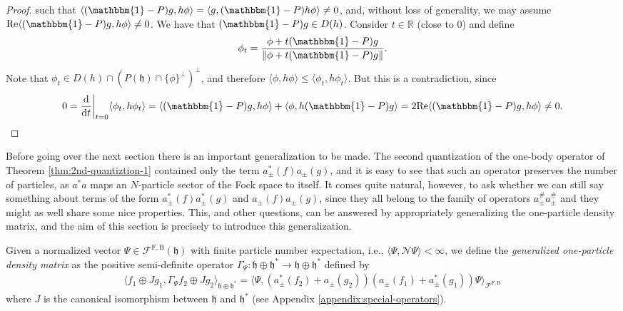 \begin{proof}
	such that $\langle(\mathbbm{1}-P)g,h\phi\rangle=\langle g,(\mathbbm{1}-P)h\phi\rangle\neq0$,
	and, without loss of generality, we may assume $\mathrm{Re}\langle(\mathbbm{1}-P)g,h\phi
	\rangle\neq0$. We have that $(\mathbbm{1}-P)g\in D(h)$. Consider $t\in\mathbb{R}$ (close to
	0) and define
	\begin{align*}
		\phi_t = \frac{\phi+t(\mathbbm{1}-P)g}{\Vert\phi+t(\mathbbm{1}-P)g\Vert}.
	\end{align*}
	Note that $\phi_t\in D(h)\cap(P(\mathfrak{h})\cap\{\phi\}^\perp)^\perp$, and therefore
	$\langle\phi,h\phi\rangle\leq\langle\phi_t,h\phi_t\rangle$. But this is a contradiction,
	since
	\begin{align*}
		0 = \frac{\dx}{\dx t}\bigg|_{t=0}\langle\phi_t,h\phi_t\rangle
		= \langle(\mathbbm{1}-P)g,h\phi\rangle + \langle\phi,h(\mathbbm{1}-P)g\rangle
		= 2\mathrm{Re}\langle(\mathbbm{1}-P)g,h\phi\rangle \neq 0.
	\end{align*}
\end{proof}

Before going over the next section there is an important generalization to be made.
The second quantization of the one-body operator of Theorem \ref{thm:2nd-quantiztion-1}
contained only the term $a^*_\pm(f)a_\pm(g)$, and it is easy to see that such an operator
preserves the number of particles, as $a^*a$ maps an $N$-particle sector of the Fock space to
itself. It comes quite natural, however, to ask whether we can still say something about terms
of the form $a^*_\pm(f)a^*_\pm(g)$ and $a_\pm(f)a_\pm(g)$, since they all belong to the family
of operators $a^\#_\pm a^\#_\pm$ and they might as well share some nice properties. This, and
other questions, can be answered by appropriately generalizing the one-particle density
matrix, and the aim of this section is precisely to introduce this generalization.

\begin{definition}
	\label{generalized-1pdm}
	Given a normalized vector $\Psi\in\mathcal{F}^{\mathrm{F,B}}(\mathfrak{h})$ with finite
	particle number expectation, i.e., $\langle\Psi,\mathcal{N}\Psi\rangle<\infty$, we define
	the \textit{generalized one-particle density matrix} as the positive semi-definite
	operator $\Gamma_\Psi : \mathfrak{h}\oplus\mathfrak{h}^* \to \mathfrak{h}\oplus\mathfrak{h}^*$
	defined by
	\begin{align*}
		\langle f_1\oplus Jg_1, \Gamma_\Psi f_2\oplus Jg_2\rangle_{\mathfrak{h}\oplus\mathfrak{h}^*}
		= \langle\Psi, (a^*_\pm(f_2)+a_\pm(g_2))(a_\pm(f_1)+a^*_\pm(g_1))\Psi\rangle_{\mathcal{F}^{\mathrm{F,B}}}
	\end{align*}
	where $J$ is the canonical isomorphism between $\mathfrak{h}$ and $\mathfrak{h}^*$ (see
	Appendix \ref{appendix:special-operators}).
\end{definition}

